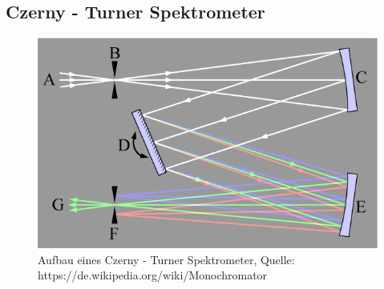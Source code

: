     \subsection{Czerny - Turner Spektrometer}
        \begin{myframe}{\subsecname}
            \begin{figure}
                \includegraphics[width=0.6\linewidth]{img/czernyTurnerSpectrometer_Wikipedia.png}
                \caption{Aufbau eines Czerny - Turner Spektrometer, Quelle: https://de.wikipedia.org/wiki/Monochromator}
                \label{czernyTurnerSpektrometer}
            \end{figure}
        \end{myframe}
